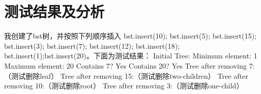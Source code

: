 \documentclass[UTF8]{ctexart}
\begin{document}
\section{测试结果及分析}
我创建了bst树，并按照下列顺序插入    bst.insert(10);
bst.insert(5);
bst.insert(15);
bst.insert(3);
bst.insert(7);
bst.insert(12);
bst.insert(18);
bst.insert(1);bst.insert(20)。下面为测试结果：\newline
Initial Tree:\newline
Minimum element: 1\newline
Maximum element: 20\newline
Contains 7? Yes\newline
Contains 20? Yes\newline
Tree after removing 7:（测试删除leaf）\newline
Tree after removing 15:（测试删除two-children）\newline
Tree after removing 10:（测试删除root）\newline
Tree after removing 3:（测试删除one-child）\newline
\end{document}

